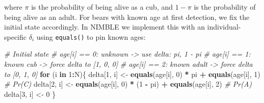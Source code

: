 \documentclass[
  12pt,
]{krantz}
\newenvironment{Shaded}{\begin{snugshade}}{\end{snugshade}}
\newcommand{\CommentTok}[1]{\textcolor[rgb]{0.56,0.35,0.01}{\textit{#1}}}
\newcommand{\ControlFlowTok}[1]{\textcolor[rgb]{0.13,0.29,0.53}{\textbf{#1}}}
\newcommand{\DecValTok}[1]{\textcolor[rgb]{0.00,0.00,0.81}{#1}}
\newcommand{\FunctionTok}[1]{\textcolor[rgb]{0.13,0.29,0.53}{\textbf{#1}}}
\newcommand{\NormalTok}[1]{#1}
\newcommand{\OtherTok}[1]{\textcolor[rgb]{0.56,0.35,0.01}{#1}}
\newcommand{\SpecialCharTok}[1]{\textcolor[rgb]{0.81,0.36,0.00}{\textbf{#1}}}
\begin{document}
where \(\pi\) is the probability of being alive as a cub, and \(1 - \pi\) is the probability of being alive as an adult. For bears with known age at first detection, we fix the initial state accordingly. In NIMBLE we implement this with an individual-specific \(\delta_i\) using \texttt{equals()} to pin known ages:

\begin{Shaded}
\begin{Highlighting}[]
\CommentTok{\# Initial state}
\CommentTok{\# age[i] == 0: unknown {-}\textgreater{} use delta: pi, 1 {-} pi}
\CommentTok{\# age[i] == 1: known cub {-}\textgreater{} force delta to [1, 0, 0]}
\CommentTok{\# age[i] == 2: known adult {-}\textgreater{} force delta to [0, 1, 0]}
\ControlFlowTok{for}\NormalTok{ (i }\ControlFlowTok{in} \DecValTok{1}\SpecialCharTok{:}\NormalTok{N)\{}
\NormalTok{  delta[}\DecValTok{1}\NormalTok{, i] }\OtherTok{\textless{}{-}} \FunctionTok{equals}\NormalTok{(age[i], }\DecValTok{0}\NormalTok{) }\SpecialCharTok{*}\NormalTok{ pi }\SpecialCharTok{+} \FunctionTok{equals}\NormalTok{(age[i], }\DecValTok{1}\NormalTok{)  }\CommentTok{\# Pr(C)}
\NormalTok{  delta[}\DecValTok{2}\NormalTok{, i] }\OtherTok{\textless{}{-}} \FunctionTok{equals}\NormalTok{(age[i], }\DecValTok{0}\NormalTok{) }\SpecialCharTok{*}\NormalTok{ (}\DecValTok{1} \SpecialCharTok{{-}}\NormalTok{ pi) }\SpecialCharTok{+} \FunctionTok{equals}\NormalTok{(age[i], }\DecValTok{2}\NormalTok{)  }\CommentTok{\# Pr(A)}
\NormalTok{  delta[}\DecValTok{3}\NormalTok{, i] }\OtherTok{\textless{}{-}} \DecValTok{0}
\NormalTok{\}}
\end{Highlighting}
\end{Shaded}
\end{document}
